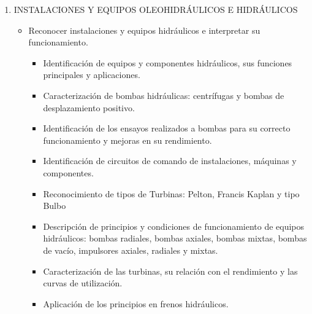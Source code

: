 \documentclass[../main]{subfiles}
\begin{document}
\begin{enumerate}
\begin{itemize}
      \item Utilizar las leyes y sus fórmulas
        en el cálculo de dispositivos
        neumáticos y oleohidráulicos.
        \begin{itemize}
          \item  Interpretación y análisis de la simbología utilizada
            en cañerías, componentes e instalaciones relacionadas con fluidos.
          \item Explicitación de ecuaciones de hidrostática e hidrodinámica.
          \item Realización de cálculo de recipientes sometidos a
            presión; ya sea en depósitos específicos, instalaciones
            o estructuras depósitos.
        \end{itemize}
    \end{itemize}
  \item INSTALACIONES Y EQUIPOS OLEOHIDRÁULICOS E HIDRÁULICOS
    \begin{itemize}
      \item Reconocer instalaciones y
        equipos hidráulicos e
        interpretar su funcionamiento.
        \begin{itemize}
          \item Identificación de equipos y componentes hidráulicos,
            sus funciones principales y aplicaciones.
          \item Caracterización de bombas hidráulicas: centrífugas y
            bombas de desplazamiento positivo.
          \item Identificación de los ensayos realizados a bombas
            para su correcto funcionamiento y mejoras en su
            rendimiento.
          \item Identificación de circuitos de comando de
            instalaciones, máquinas y componentes.
          \item Reconocimiento de tipos de Turbinas: Pelton, Francis
            Kaplan y tipo Bulbo
          \item Descripción de principios y condiciones de
            funcionamiento de equipos hidráulicos: bombas
            radiales, bombas axiales, bombas mixtas, bombas de
            vacío, impulsores axiales, radiales y mixtas.
          \item Caracterización de las turbinas, su relación con el
            rendimiento y las curvas de utilización.
          \item Aplicación de los principios en frenos hidráulicos.
        \end{itemize}

\end{itemize}
\end{enumerate}
\end{document}
